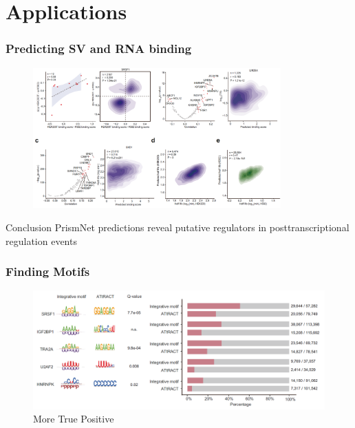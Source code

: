 \documentclass{ctexbeamer}
\begin{document}
\section{Applications}
\begin{frame}
  \frametitle{Predicting SV and RNA binding}
  \begin{figure}[H]
    \center
    \includegraphics[width=0.85\textwidth]{./figures/predict.png}
    \label{fig:predict}
  \end{figure}
  \begin{block}{Conclusion}
  PrismNet predictions reveal putative regulators in posttranscriptional
regulation events
  \end{block}
\end{frame}

\begin{frame}
  \frametitle{Finding Motifs}
  \begin{figure}[H]
    \center
    \includegraphics[width=\textwidth]{./figures/motif1.png}
    \caption{More True Positive}
    \label{fig:motif1}
  \end{figure}
\end{frame}
\end{document}
